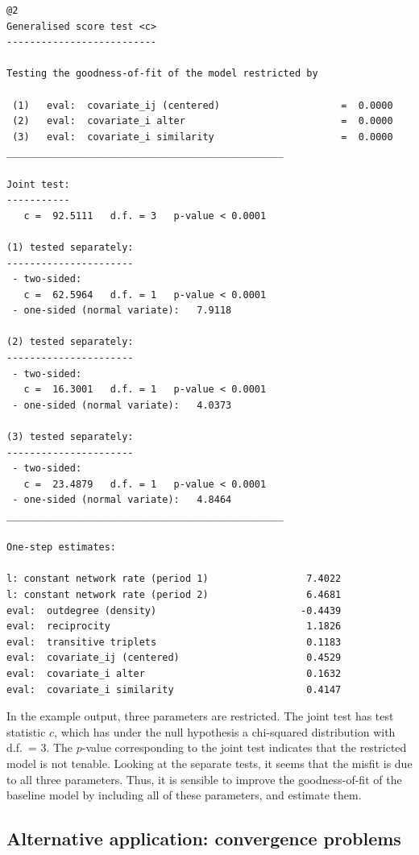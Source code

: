 \documentclass[a4paper,fleqn,11pt]{article}
\newcommand{\+}{\, + \,}
\begin{document}
{\footnotesize
\begin{verbatim}
@2
Generalised score test <c>
--------------------------

Testing the goodness-of-fit of the model restricted by

 (1)   eval:  covariate_ij (centered)                     =  0.0000
 (2)   eval:  covariate_i alter                           =  0.0000
 (3)   eval:  covariate_i similarity                      =  0.0000
________________________________________________

Joint test:
-----------
   c =  92.5111   d.f. = 3   p-value < 0.0001

(1) tested separately:
----------------------
 - two-sided:
   c =  62.5964   d.f. = 1   p-value < 0.0001
 - one-sided (normal variate):   7.9118

(2) tested separately:
----------------------
 - two-sided:
   c =  16.3001   d.f. = 1   p-value < 0.0001
 - one-sided (normal variate):   4.0373

(3) tested separately:
----------------------
 - two-sided:
   c =  23.4879   d.f. = 1   p-value < 0.0001
 - one-sided (normal variate):   4.8464
________________________________________________

One-step estimates:

l: constant network rate (period 1)                 7.4022
l: constant network rate (period 2)                 6.4681
eval:  outdegree (density)                         -0.4439
eval:  reciprocity                                  1.1826
eval:  transitive triplets                          0.1183
eval:  covariate_ij (centered)                      0.4529
eval:  covariate_i alter                            0.1632
eval:  covariate_i similarity                       0.4147
\end{verbatim}
}

In the example output, three parameters are restricted.
The joint test has test statistic $c$, which has under the
null hypothesis a chi-squared distribution with d.f.\ = 3.
The $p$-value corresponding to the joint test indicates
that the restricted model is not tenable. Looking at the separate
tests, it seems that the misfit is due to all three parameters.
Thus, it is sensible to improve
the goodness-of-fit of the baseline model by including all of these parameters,
and estimate them.

\subsection{Alternative application: convergence problems}
\label{alternative}
\end{document}
